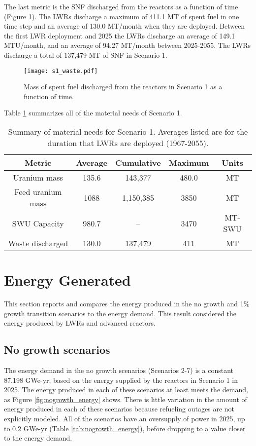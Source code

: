 The last metric is the \gls{SNF} discharged from the reactors as a function of
time (Figure \ref{fig:waste1}). The \glspl{LWR} discharge a maximum of 411.1 MT 
of spent fuel in one time step and an average of 130.0 MT/month when they are 
deployed. Between the first \gls{LWR} deployment and 2025 the \glspl{LWR} 
discharge an average of 149.1 MTU/month, and an average of 94.27 MT/month  
between 2025-2055. The \glspl{LWR} discharge a total of 137,479 MT of \gls{SNF} 
in Scenario 1. 

\begin{figure}[h!]
    \centering
    \texttt{[image: s1\_waste.pdf]}
    \caption{Mass of spent fuel discharged from the reactors in Scenario 1 as a function of time.}
    \label{fig:waste1}
\end{figure}

Table \ref{tab:s1_results} summarizes all of the material needs of Scenario 1. 

\begin{table}[h!]
    \centering
    \caption{Summary of material needs for Scenario 1. Averages listed 
    are for the duration that \glspl{LWR} are deployed (1967-2055).}
    \label{tab:s1_results}
    \begin{tabular}{c c c c c}
        \hline 
        Metric & Average & Cumulative & Maximum & Units \\\hline
        Uranium mass & 135.6 & 143,377 & 480.0 & MT \\
        Feed uranium mass & 1088 & 1,150,385 & 3850 & MT \\
        SWU Capacity & 980.7 & -- & 3470 & MT-SWU \\
        Waste discharged & 130.0 & 137,479 & 411 & MT \\
        \hline        
    \end{tabular}
\end{table}

\section{Energy Generated} \label{sec:energy}
This section reports and compares the energy produced in the no growth and 
1\% growth transition scenarios to the energy demand. This result 
considered the energy produced by \glspl{LWR} and advanced reactors. 

\subsection{No growth scenarios}
The energy demand in the no growth scenarios (Scenarios 2-7) is a constant
87.198 GWe-yr, based on the energy supplied by the reactors in Scenario 1
in 2025. The energy produced in each of these scenarios at least meets the 
demand, as Figure \ref{fig:nogrowth_energy} shows. There is little variation 
in the amount of energy produced in each of these scenarios because refueling 
outages are not explicitly modeled. All of the scenarios have an oversupply 
of power in 2025, up to 0.2 GWe-yr (Table \ref{tab:nogrowth_energy}), before 
dropping to a value closer to the energy demand.  

